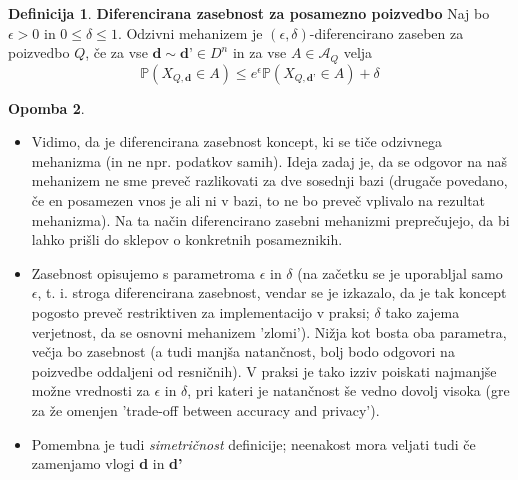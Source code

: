 \documentclass[12pt,a4paper]{amsart}
\theoremstyle{definition} %
\newtheorem{definicija}{Definicija}[section]
\newtheorem{opomba}[definicija]{Opomba}
\theoremstyle{plain} %
\begin{document}
\begin{definicija}{\textbf{Diferencirana zasebnost za posamezno poizvedbo}}
Naj bo $\epsilon > 0$ in $0 \leq \delta \leq 1 $. Odzivni mehanizem je $(\epsilon, \delta)$-diferencirano zaseben za poizvedbo $Q$, če za vse $\textbf{d} \sim \textbf{d'} \in D^n$  in za vse $A\in\mathcal{A}_{Q}$ velja 
\begin{equation}\label{diferen}
\mathbb{P}(X_{Q,\textbf{d}} \in A) \leq e^\epsilon \mathbb{P}(X_{Q,\textbf{d'}} \in A) + \delta \tag{4}
\end{equation}
\end{definicija}
\begin{opomba} 
\begin{itemize}
\item Vidimo, da je diferencirana zasebnost koncept, ki se tiče odzivnega mehanizma (in ne npr. podatkov samih). Ideja zadaj je, da se odgovor na naš mehanizem ne sme preveč razlikovati za dve sosednji bazi (drugače povedano, če en posamezen vnos je ali ni v bazi, to ne bo preveč vplivalo na rezultat mehanizma). Na ta način diferencirano zasebni mehanizmi preprečujejo, da bi lahko prišli do sklepov o konkretnih posameznikih. 
\item Zasebnost opisujemo s parametroma $\epsilon$ in $\delta$ (na začetku se je uporabljal samo $\epsilon$, t. i. stroga diferencirana zasebnost, vendar se je izkazalo, da je tak koncept pogosto preveč restriktiven za implementacijo v praksi; $\delta$ tako zajema verjetnost, da se osnovni mehanizem 'zlomi'). Nižja kot bosta oba parametra, večja bo zasebnost (a tudi manjša natančnost, bolj bodo odgovori na poizvedbe oddaljeni od resničnih). V praksi je tako izziv poiskati najmanjše možne vrednosti za $\epsilon$ in $\delta$, pri kateri je natančnost še vedno dovolj visoka (gre za že omenjen 'trade-off between accuracy and privacy').
\item Pomembna je tudi \textit{simetričnost} definicije; neenakost mora veljati tudi če zamenjamo vlogi \textbf{d} in \textbf{d'}
\end{itemize}
\end{opomba}
\end{document}

